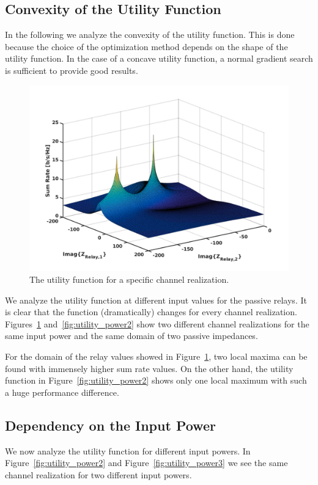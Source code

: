 \subsection{Convexity of the Utility Function}
\label{sec:}

In the following we analyze the convexity of the utility function.
This is done because the choice of the optimization method depends on the shape of the utility function. In the case of a concave utility function, a normal gradient search is sufficient to provide good results.
\begin{figure}[h]
\centering
  \includegraphics[width=0.8\linewidth]{images/full_mesh_highsnr_93.png}
\caption{The utility function for a specific channel realization.}
\label{fig:utility_power1}
\end{figure}

We analyze the utility function at different input values for the passive relays.
It is clear that the function (dramatically) changes for every channel realization.
Figures~\ref{fig:utility_power1} and~\ref{fig:utility_power2} show two different channel realizations for the same input power and the same domain of two passive impedances.


For the domain of the relay values showed in Figure~\ref{fig:utility_power1}, two local maxima can be found with immensely higher sum rate values.
On the other hand, the utility function in Figure~\ref{fig:utility_power2} shows only one local maximum with such a huge performance difference. 


\subsection{Dependency on the Input Power}
\label{sec:depinpow}

We now analyze the utility function for different input powers.
In Figure~\ref{fig:utility_power2} and Figure~\ref{fig:utility_power3} we see the same channel realization for two different input powers.


